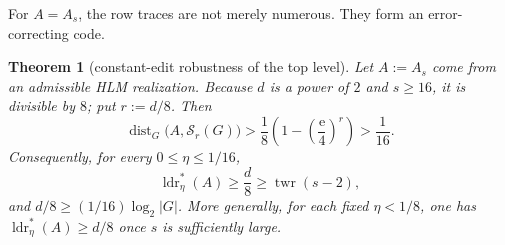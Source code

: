 \documentclass[10pt,a4paper]{amsart}
\newtheorem{theorem}{Theorem}
\numberwithin{theorem}{section}
\newcommand{\abs}[1]{\lvert #1\rvert}
\newcommand{\twr}{\operatorname{twr}}
\newcommand{\ldrs}{\operatorname{ldr}^{*}}
\newcommand{\Stable}{\mathcal{S}}
\newcommand{\econst}{\mathrm e}
\begin{document}
For $A=A_s$, the row traces are not merely numerous.  They form an
error-correcting code.

\begin{theorem}[constant-edit robustness of the top level]\label{thm:robust}
Let $A:=A_s$ come from an admissible HLM realization.  Because $d$ is a
power of $2$ and $s\ge16$, it is divisible by $8$; put $r:=d/8$.  Then
\begin{equation}\label{eq:robust-distance}
  \operatorname{dist}_G\bigl(A,\Stable_r(G)\bigr)
  >\frac18\left(1-\left(\frac{\econst}{4}\right)^r\right)
  >\frac1{16}.
\end{equation}
Consequently, for every $0\le\eta\le1/16$,
\[
  \ldrs_\eta(A)\ge\frac d8\ge\twr(s-2),
\]
and $d/8\ge(1/16)\log_2\abs G$.  More generally, for each fixed $\eta<1/8$, one has
$\ldrs_\eta(A)\ge d/8$ once $s$ is sufficiently large.
\end{theorem}
\end{document}
